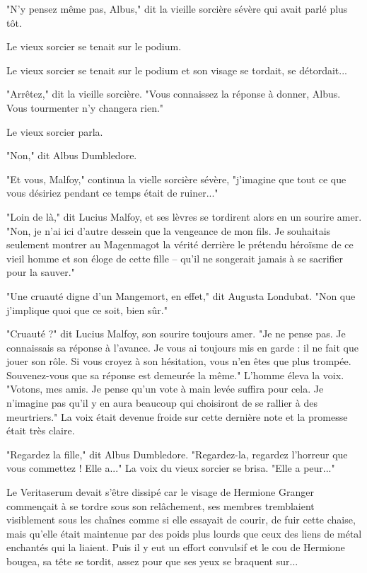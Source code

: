 "N'y pensez même pas, Albus," dit la vieille sorcière sévère qui avait parlé plus tôt.

Le vieux sorcier se tenait sur le podium.

Le vieux sorcier se tenait sur le podium et son visage se tordait, se détordait...

"Arrêtez," dit la vieille sorcière. "Vous connaissez la réponse à donner, Albus. Vous tourmenter n'y changera rien."

Le vieux sorcier parla.

"Non," dit Albus Dumbledore.

"Et vous, Malfoy," continua la vielle sorcière sévère, "j'imagine que tout ce que vous désiriez pendant ce temps était de ruiner..."

"Loin de là," dit Lucius Malfoy, et ses lèvres se tordirent alors en un sourire amer. "Non, je n'ai ici d'autre dessein que la vengeance de mon fils. Je souhaitais seulement montrer au Magenmagot la vérité derrière le prétendu héroïsme de ce vieil homme et son éloge de cette fille – qu'il ne songerait jamais à se sacrifier pour la sauver."

"Une cruauté digne d'un Mangemort, en effet," dit Augusta Londubat. "Non que j'implique quoi que ce soit, bien sûr."

"Cruauté ?" dit Lucius Malfoy, son sourire toujours amer. "Je ne pense pas. Je connaissais sa réponse à l'avance. Je vous ai toujours mis en garde : il ne fait que jouer son rôle. Si vous croyez à son hésitation, vous n'en êtes que plus trompée. Souvenez-vous que sa réponse est demeurée la même." L'homme éleva la voix. "Votons, mes amis. Je pense qu'un vote à main levée suffira pour cela. Je n'imagine pas qu'il y en aura beaucoup qui choisiront de se rallier à des meurtriers." La voix était devenue froide sur cette dernière note et la promesse était très claire.

"Regardez la fille," dit Albus Dumbledore. "Regardez-la, regardez l'horreur que vous commettez ! Elle a..." La voix du vieux sorcier se brisa. "Elle a peur..."

Le Veritaserum devait s'être dissipé car le visage de Hermione Granger commençait à se tordre sous son relâchement, ses membres tremblaient visiblement sous les chaînes comme si elle essayait de courir, de fuir cette chaise, mais qu'elle était maintenue par des poids plus lourds que ceux des liens de métal enchantés qui la liaient. Puis il y eut un effort convulsif et le cou de Hermione bougea, sa tête se tordit, assez pour que ses yeux se braquent sur...

